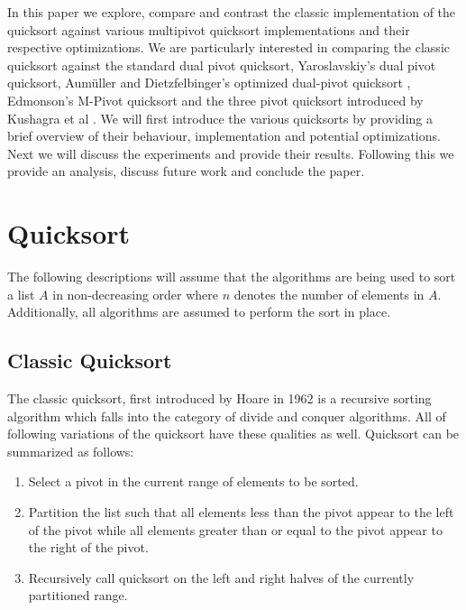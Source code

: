     In this paper we explore, compare and contrast the classic implementation of the quicksort against various multipivot quicksort implementations and their respective optimizations. We are particularly interested in comparing the classic quicksort against the standard dual pivot quicksort, Yaroslavskiy's dual pivot quicksort\cite{yaroslavskiy2009dual}, Aum\"{u}ller and Dietzfelbinger's optimized dual-pivot quicksort \cite{Aumuller:2013:OPD:2525857.2525862}, Edmonson's M-Pivot quicksort \cite{edmondson2005m} and the three pivot quicksort introduced by Kushagra et al \cite{kushagra2013multi}. We will first introduce the various quicksorts by providing a brief overview of their behaviour, implementation and potential optimizations. Next we will discuss the experiments and provide their results. Following this we provide an analysis, discuss future work and conclude the paper. 

\section{Quicksort}
	The following descriptions will assume that the algorithms are being used to sort a list $A$ in non-decreasing order where $n$ denotes the number of elements in $A$. Additionally, all algorithms are assumed to perform the sort in place. 

	\subsection{Classic Quicksort}
		\label{subsec:ClassicQSortIntro}
        The classic quicksort, first introduced by Hoare \cite{Hoare01011962} in 1962 is a recursive sorting algorithm which falls into the category of divide and conquer algorithms. All of following variations of the quicksort have these qualities as well. Quicksort can be summarized as follows:
        \begin{enumerate}
        \item Select a pivot in the current range of elements to be sorted.
        \item Partition the list such that all elements less than the pivot appear to the left of the pivot while all elements greater than or equal to the pivot appear to the right of the pivot.
        \item Recursively call quicksort on the left and right halves of the currently partitioned range.
        \end{enumerate}

